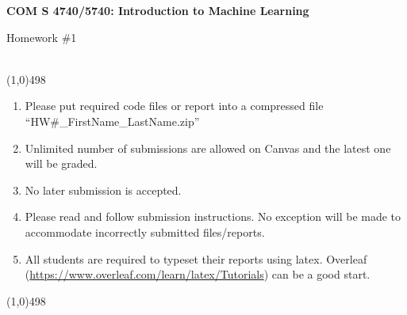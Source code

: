 \documentclass[11pt]{article}
\begin{document}
\begin{center}
{\Large \textbf{COM S 4740/5740: Introduction to Machine Learning}

Homework \#1}\\

\linethickness{1mm}\line(1,0){498}

\begin{enumerate}
\item Please put required code files or report into a
compressed file ``HW\#\_FirstName\_LastName.zip''
\item Unlimited number of submissions are
allowed on Canvas and the latest one will be graded.
\item {\color{red} No later submission is accepted.}
\item Please read and follow submission instructions. No exception
will be made to accommodate incorrectly submitted files/reports.
\item All students are required to typeset their reports using
latex. Overleaf
(\url{https://www.overleaf.com/learn/latex/Tutorials}) can be a
good start.
\end{enumerate}

\linethickness{1mm}\line(1,0){498}

\end{center}


\end{document}
